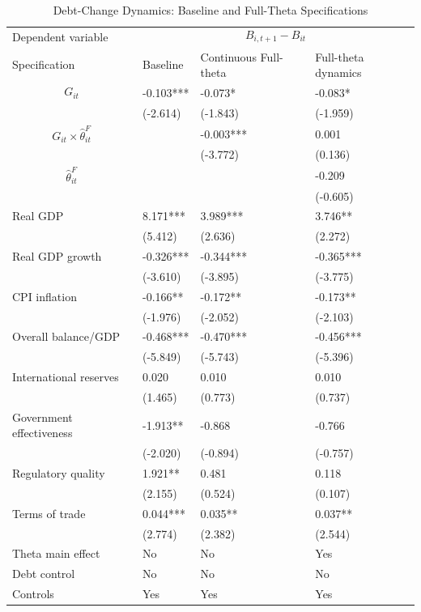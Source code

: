 \begin{table}[H]\centering
\begin{threeparttable}
\caption{Debt-Change Dynamics: Baseline and Full-Theta Specifications}
\label{tab:debt_change_combined_fulltheta}
\scriptsize
\begin{tabularx}{\textwidth}{lYYY}
\toprule
Dependent variable &  \\
\cmidrule(lr){2-4}
Specification & Baseline & Continuous Full-theta & Full-theta dynamics \\
\midrule
$$G_{it}$$ & -0.103*** & -0.073* & -0.083* \\
 & (-2.614) & (-1.843) & (-1.959) \\
$$G_{it}\times\widehat{\theta}^{F}_{it}$$ &  & -0.003*** & 0.001 \\
 &  & (-3.772) & (0.136) \\
$$\widehat{\theta}^{F}_{it}$$ &  &  & -0.209 \\
 &  &  & (-0.605) \\
Real GDP & 8.171*** & 3.989*** & 3.746** \\
 & (5.412) & (2.636) & (2.272) \\
Real GDP growth & -0.326*** & -0.344*** & -0.365*** \\
 & (-3.610) & (-3.895) & (-3.775) \\
CPI inflation & -0.166** & -0.172** & -0.173** \\
 & (-1.976) & (-2.052) & (-2.103) \\
Overall balance/GDP & -0.468*** & -0.470*** & -0.456*** \\
 & (-5.849) & (-5.743) & (-5.396) \\
International reserves & 0.020 & 0.010 & 0.010 \\
 & (1.465) & (0.773) & (0.737) \\
Government effectiveness & -1.913** & -0.868 & -0.766 \\
 & (-2.020) & (-0.894) & (-0.757) \\
Regulatory quality & 1.921** & 0.481 & 0.118 \\
 & (2.155) & (0.524) & (0.107) \\
Terms of trade & 0.044*** & 0.035** & 0.037** \\
 & (2.774) & (2.382) & (2.544) \\
\midrule
Theta main effect & No & No & Yes \\
Debt control & No & No & No \\
Controls & Yes & Yes & Yes \\

\end{tabularx}
\end{threeparttable}
\end{table}
